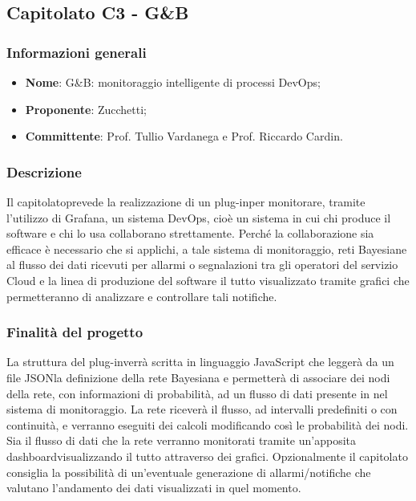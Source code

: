 \subsection{Capitolato C3 - G\&B}
\subsubsection{Informazioni generali}
\begin{itemize}
	\item \textbf{Nome}: G\&B: monitoraggio intelligente di processi DevOps\glo;
	\item \textbf{Proponente}: Zucchetti;
	\item \textbf{Committente}: Prof. Tullio Vardanega e Prof. Riccardo Cardin.
\end{itemize}
\subsubsection{Descrizione}
Il capitolato\glo prevede la realizzazione di un plug-in\glo per monitorare, tramite l'utilizzo di Grafana\glo, un sistema DevOps\glo, cioè un sistema in cui chi produce il software e chi lo usa collaborano strettamente. Perché la collaborazione sia efficace è necessario che si applichi, a tale sistema di monitoraggio, reti Bayesiane al flusso dei dati ricevuti per allarmi o segnalazioni tra gli operatori del servizio Cloud e la linea di produzione del software il tutto visualizzato tramite grafici che permetteranno di analizzare e controllare tali notifiche.
\subsubsection{Finalità del progetto}
La struttura del plug-in\glo verrà scritta in linguaggio JavaScript che leggerà da un file JSON\glo la definizione della rete Bayesiana e permetterà di associare dei nodi della rete, con informazioni di probabilità, ad un flusso di dati presente in nel sistema di monitoraggio. La rete riceverà il flusso, ad intervalli predefiniti o con continuità, e verranno eseguiti dei calcoli modificando così le probabilità dei nodi. Sia il flusso di dati che la rete verranno monitorati tramite un'apposita dashboard\glo visualizzando il tutto attraverso dei grafici. Opzionalmente il capitolato consiglia la possibilità di	un'eventuale generazione di allarmi/notifiche che valutano l'andamento dei dati visualizzati in quel momento.
